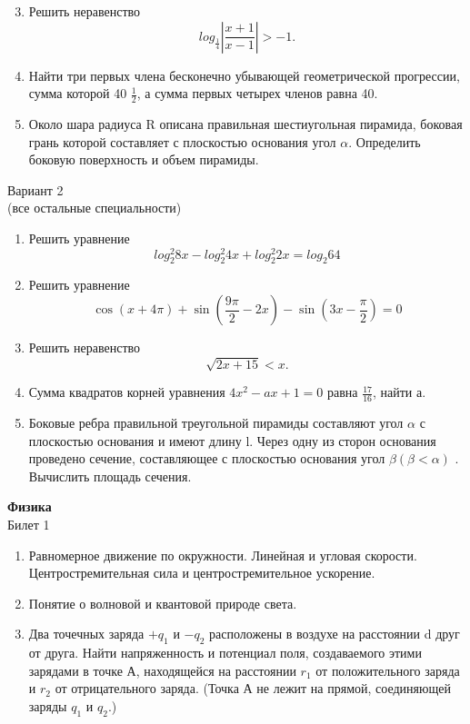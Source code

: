 \twocolumn

\begin{enumerate}
  	\setcounter{enumi}{2}
  	\item Решить неравенство
		\[log_{\frac{1}{4}} |\frac{x + 1}{x - 1}| > -1.\]
	\item Найти три первых члена бесконечно убывающей геометрической прогрессии, сумма которой 40 $\frac{1}{2}$, 
		а сумма первых четырех членов равна 40.
	 \item Около шара радиуса R описана правильная шестиугольная пирамида, боковая грань которой составляет
		 с плоскостью основания угол $\alpha$. Определить боковую поверхность и объем пирамиды.
\end{enumerate}

\begin{center}
	{ Вариант 2}\\
	(все остальные специальности)
\end{center}

\begin{enumerate}
	\item Решить уравнение \[log_2^2 8x - log_2^2 4x + log_2^2 2x = log_2 64\]
	\item Решить уравнение \[ \cos(x+4\pi) + \sin(\frac{9\pi}{2} - 2x) - \sin(3x - \frac{\pi}{2}) = 0\]
	\item Решить неравенство \[\sqrt{2x + 15} < x.\]
	\item Сумма квадратов корней уравнения $4x^2 - ax + 1 = 0$ равна $\frac{17}{16}$, найти а.
	\item Боковые ребра правильной треугольной пирамиды составляют угол $\alpha$ с плоскостью основания и имеют длину l.
		Через одну из сторон основания проведено сечение, составляющее с плоскостью основания угол $\beta (\beta < \alpha)$ . 
		Вычислить площадь сечения.
\end{enumerate}

\begin{center}
	\textbf{Физика} \\
	{ Билет 1}
\end{center}

\begin{enumerate}
	\item Равномерное движение по окружности. Линейная и угловая скорости. 
		Центростремительная сила и центростремительное ускорение.
	\item Понятие о волновой и квантовой природе света.
	\item Два точечных заряда $+q_1$ и $-q_2$  расположены в воздухе на расстоянии d друг от друга. 
		Найти напряженность и потенциал поля, создаваемого этими зарядами в точке А, находящейся на расстоянии $r_1$
		от положительного заряда и $r_2$ от отрицательного заряда. (Точка А не лежит на прямой, соединяющей заряды 
		$q_1$ и $q_2$.)
 \end{enumerate}

